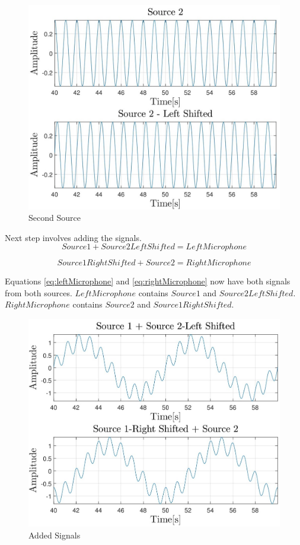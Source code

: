 \begin{figure}[htp]
	\centering
	\includegraphics[width=\textwidth]{Illustrations/source2.jpg}
	\caption{Second Source}
	\label{fig:source2}
\end{figure}
Next step involves adding the signals.
\begin{equation}
	Source1 + Source2LeftShifted = LeftMicrophone
	\label{eq:leftMicrophone}
\end{equation}


\begin{equation}
	Source1RightShifted + Source2 = RightMicrophone
	\label{eq:rightMicrophone}
\end{equation}

Equations \ref{eq:leftMicrophone} and \ref{eq:rightMicrophone} now have both signals from both sources.
\newpage
$LeftMicrophone$ contains $Source1$ and $Source2LeftShifted$. $RightMicrophone$ contains $Source2$
and $Source1RightShifted$.
\begin{figure}[htp]
	\centering
	\includegraphics[width=\textwidth]{Illustrations/source1And2.jpg}
	\caption{Added Signals}
	\label{fig:source1And2}
\end{figure}

